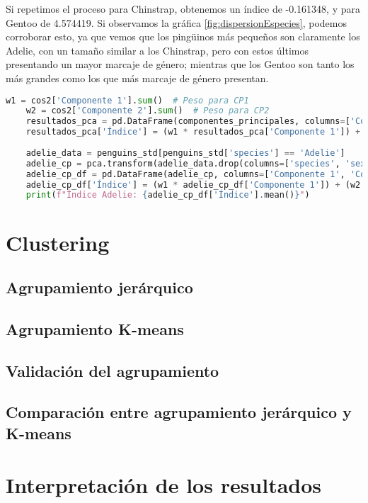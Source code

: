 \documentclass[a4paper,onecolumn]{extarticle}
\let\stdsection\section
\renewcommand\section{\newpage\stdsection}
\begin{document}
\begin{sloppypar}
Si repetimos el proceso para Chinstrap, obtenemos un índice de -0.161348, y para Gentoo de 4.574419. Si observamos 
la gráfica \ref{fig:dispersionEspecies}, podemos corroborar esto, ya que vemos que los pingüinos más pequeños son claramente los Adelie, con un tamaño similar 
a los Chinstrap, pero con estos últimos presentando un mayor marcaje de género; mientras que los Gentoo son tanto los más grandes como los que más marcaje de 
género presentan.
\begin{lstlisting}[language=Python]
    w1 = cos2['Componente 1'].sum()  # Peso para CP1
    w2 = cos2['Componente 2'].sum()  # Peso para CP2
    resultados_pca = pd.DataFrame(componentes_principales, columns=['Componente 1', 'Componente 2'])
    resultados_pca['Índice'] = (w1 * resultados_pca['Componente 1']) + (w2 * resultados_pca['Componente 2'])
    
    adelie_data = penguins_std[penguins_std['species'] == 'Adelie']
    adelie_cp = pca.transform(adelie_data.drop(columns=['species', 'sex']))
    adelie_cp_df = pd.DataFrame(adelie_cp, columns=['Componente 1', 'Componente 2'])
    adelie_cp_df['Índice'] = (w1 * adelie_cp_df['Componente 1']) + (w2 * adelie_cp_df['Componente 2'])
    print(f"Índice Adelie: {adelie_cp_df['Índice'].mean()}")
\end{lstlisting}

\section{Clustering} \label{clustering}
\subsection{Agrupamiento jerárquico} \label{jerarquico}

\subsection{Agrupamiento K-means} \label{kmeans}

\subsection{Validación del agrupamiento} \label{validacion}

\subsection{Comparación entre agrupamiento jerárquico y K-means} \label{comparacion}

\section{Interpretación de los resultados} \label{resultados}

\end{sloppypar}
\end{document}
